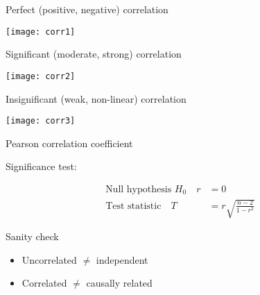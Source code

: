 \documentclass[t]{beamer}
\begin{document}

	\begin{frame}[c]{Perfect (positive, negative) correlation}
			
		\begin{center}
			\texttt{[image: corr1]}		
		\end{center}

	\end{frame}	

	\begin{frame}[c]{Significant (moderate, strong) correlation}
			
		\begin{center}
			\texttt{[image: corr2]}		
		\end{center}

	\end{frame}	

	\begin{frame}[c]{Insignificant (weak, non-linear) correlation}
			
		\begin{center}
			\texttt{[image: corr3]}		
		\end{center}

	\end{frame}
	
	
	\begin{frame}{Pearson correlation coefficient}
	
		\begin{block}{Significance test:}

			\begin{align*}
				\text{Null hypothesis~} H_0 \quad
				r &= 0
				\\
				\text{Test statistic} \quad
				T &= r \sqrt{\frac{n-2}{1-r^2}}
			\end{align*}

		\end{block}
		
		\begin{alertblock}{Sanity check}

			\begin{itemize}
				\item Uncorrelated $\neq$ independent
				\item Correlated $\neq$ causally related
			\end{itemize}
			
		\end{alertblock}
						
	\end{frame}
		
\end{document}
